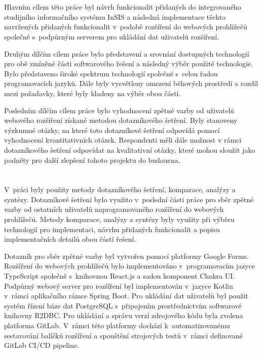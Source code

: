 \section*{\CilPrace}

Hlavním cílem této práce byl návrh funkcionalit přidaných do integrovaného studijního informačního systému InSIS a následná implementace těchto navržených přidaných funkcionalit v~podobě rozšíření do webových prohlížečů společně s~podpůrným serverem pro ukládání dat uživatelů rozšíření. 

Druhým dílčím cílem práce bylo představení a srovnání dostupných technologií pro obě zmíněné části softwarového řešení a následný výběr použité technologie. Bylo představeno široké spektrum technologií společně s~celou řadou programovacích jazyků. Dále byly vysvětleny omezení běhových prostředí a rozdíl mezi požadavky, které byly kladeny na výběr obou částí.  

Posledním dílčím cílem práce bylo vyhodnocení zpětné vazby od uživatelů webového rozšíření získané metodou dotazníkového šetření. Byly stanoveny výzkumné otázky, na které toto dotazníkové šetření odpovídá pomocí vyhodnocení kvantitativních otázek. Respondenti měli dále možnost v rámci dotazníkového šetření odpovídat na kvalitativní otázky, které mohou sloužit jako podněty pro další zlepšení tohoto projektu do budoucna. 

\section*{\PouziteMetody}

V~práci byly použity metody dotazníkového šetření, komparace, analýzy a syntézy. Dotazníkové šetření bylo využito v~poslední části práce pro sběr zpětné vazby od ostatních uživatelů naprogramovaného rozšíření do webových prohlížečů. Metody komparace, analýzy a syntézy byly využity při výběru technologií pro implementaci, návrhu přidaných funkcionalit a popisu implementačních detailů obou částí řešení.    

Dotazník pro sběr zpětné vazby byl vytvořen pomocí platformy Google Forms. Rozšíření do webových prohlížečů bylo implementováno v~programovacím jazyce TypeScript společně s~knihovnou React.js a sadou komponent Chakra UI. Podpůrný webový server pro rozšíření byl implementován v~jazyce Kotlin v~rámci aplikačního rámce Spring Boot. Pro ukládání dat uživatelů byl použit systém řízení báze dat PostgreSQL s~připojením prostřednictvím softwarové knihovny R2DBC. Pro ukládání a správu verzí zdrojového kódu byla zvolena platforma GitLab. V~rámci této platformy dochází k~automatizovanému sestavování balíčků rozšíření a spouštění strojových testů v~rámci definované GitLab CI/CD pipeline.


